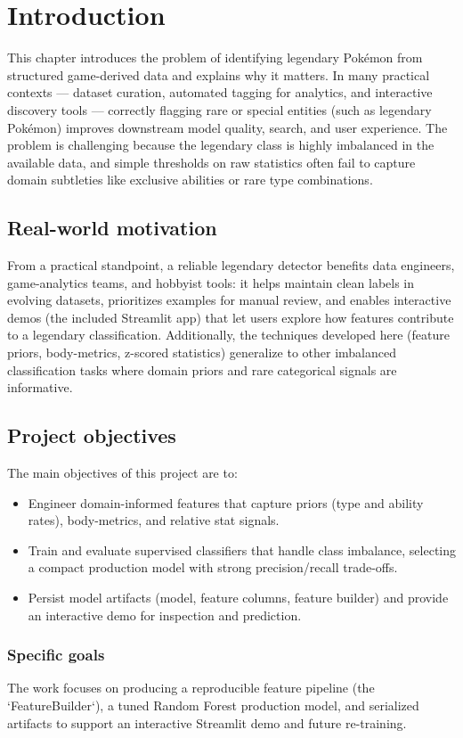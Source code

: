 \chapter{Introduction}

This chapter introduces the problem of identifying legendary Pokémon from structured game-derived data and explains why it matters. In many practical contexts — dataset curation, automated tagging for analytics, and interactive discovery tools — correctly flagging rare or special entities (such as legendary Pokémon) improves downstream model quality, search, and user experience. The problem is challenging because the legendary class is highly imbalanced in the available data, and simple thresholds on raw statistics often fail to capture domain subtleties like exclusive abilities or rare type combinations.

\section{Real-world motivation}

From a practical standpoint, a reliable legendary detector benefits data engineers, game-analytics teams, and hobbyist tools: it helps maintain clean labels in evolving datasets, prioritizes examples for manual review, and enables interactive demos (the included Streamlit app) that let users explore how features contribute to a legendary classification. Additionally, the techniques developed here (feature priors, body-metrics, z-scored statistics) generalize to other imbalanced classification tasks where domain priors and rare categorical signals are informative.

\section{Project objectives}

The main objectives of this project are to:
\begin{itemize}
  \item Engineer domain-informed features that capture priors (type and ability rates), body-metrics, and relative stat signals.
  \item Train and evaluate supervised classifiers that handle class imbalance, selecting a compact production model with strong precision/recall trade-offs.
  \item Persist model artifacts (model, feature columns, feature builder) and provide an interactive demo for inspection and prediction.
\end{itemize}

\subsection{Specific goals}

The work focuses on producing a reproducible feature pipeline (the `FeatureBuilder`), a tuned Random Forest production model, and serialized artifacts to support an interactive Streamlit demo and future re-training.
